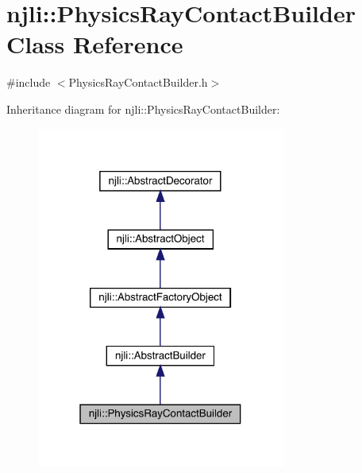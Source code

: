 \hypertarget{classnjli_1_1_physics_ray_contact_builder}{}\section{njli\+:\+:Physics\+Ray\+Contact\+Builder Class Reference}
\label{classnjli_1_1_physics_ray_contact_builder}


{\ttfamily \#include $<$Physics\+Ray\+Contact\+Builder.\+h$>$}



Inheritance diagram for njli\+:\+:Physics\+Ray\+Contact\+Builder\+:\nopagebreak
\begin{figure}[H]
\begin{center}
\leavevmode
\includegraphics[width=232pt]{classnjli_1_1_physics_ray_contact_builder__inherit__graph}
\end{center}
\end{figure}


